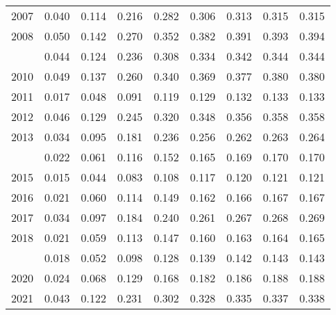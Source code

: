\documentclass[
]{article}
\begin{document}
\begin{longtable}[t]{lrrrrrrrr}
2007 & 0.040 & 0.114 & 0.216 & 0.282 & 0.306 & 0.313 & 0.315 & 0.315\\
2008 & 0.050 & 0.142 & 0.270 & 0.352 & 0.382 & 0.391 & 0.393 & 0.394\\
\addlinespace
2009 & 0.044 & 0.124 & 0.236 & 0.308 & 0.334 & 0.342 & 0.344 & 0.344\\
2010 & 0.049 & 0.137 & 0.260 & 0.340 & 0.369 & 0.377 & 0.380 & 0.380\\
2011 & 0.017 & 0.048 & 0.091 & 0.119 & 0.129 & 0.132 & 0.133 & 0.133\\
2012 & 0.046 & 0.129 & 0.245 & 0.320 & 0.348 & 0.356 & 0.358 & 0.358\\
2013 & 0.034 & 0.095 & 0.181 & 0.236 & 0.256 & 0.262 & 0.263 & 0.264\\
\addlinespace
2014 & 0.022 & 0.061 & 0.116 & 0.152 & 0.165 & 0.169 & 0.170 & 0.170\\
2015 & 0.015 & 0.044 & 0.083 & 0.108 & 0.117 & 0.120 & 0.121 & 0.121\\
2016 & 0.021 & 0.060 & 0.114 & 0.149 & 0.162 & 0.166 & 0.167 & 0.167\\
2017 & 0.034 & 0.097 & 0.184 & 0.240 & 0.261 & 0.267 & 0.268 & 0.269\\
2018 & 0.021 & 0.059 & 0.113 & 0.147 & 0.160 & 0.163 & 0.164 & 0.165\\
\addlinespace
2019 & 0.018 & 0.052 & 0.098 & 0.128 & 0.139 & 0.142 & 0.143 & 0.143\\
2020 & 0.024 & 0.068 & 0.129 & 0.168 & 0.182 & 0.186 & 0.188 & 0.188\\
2021 & 0.043 & 0.122 & 0.231 & 0.302 & 0.328 & 0.335 & 0.337 & 0.338\\*
\end{longtable}
\end{document}
